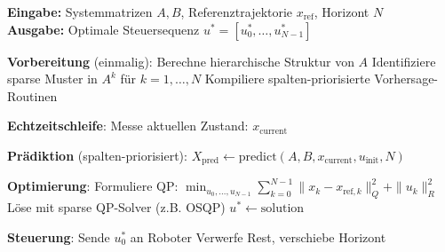 \documentclass[a4paper,12pt]{report}
\theoremstyle{definition}
\begin{document}
	\begin{algorithm}[H]
		\caption{Strukturausnutzende MPC für Robotersteuerung}
		\label{alg:robot-mpc}
		\textbf{Eingabe:} Systemmatrizen $A, B$, Referenztrajektorie $x_{\text{ref}}$, Horizont $N$ \\
		\textbf{Ausgabe:} Optimale Steuersequenz $u^* = [u_0^*, \ldots, u_{N-1}^*]$
		\begin{algorithmic}[1]
			\State \textbf{Vorbereitung} (einmalig):
			\State Berechne hierarchische Struktur von $A$
			\State Identifiziere sparse Muster in $A^k$ für $k = 1, \ldots, N$
			\State Kompiliere spalten-priorisierte Vorhersage-Routinen
			
			\State \textbf{Echtzeitschleife}:
			\State Messe aktuellen Zustand: $x_{\text{current}}$
			
			\State \textbf{Prädiktion} (spalten-priorisiert):
			\State $X_{\text{pred}} \gets \text{predict}(A, B, x_{\text{current}}, u_{\text{init}}, N)$
			
			\State \textbf{Optimierung}:
			\State Formuliere QP: $\min_{u_0, \ldots, u_{N-1}} \sum_{k=0}^{N-1} \|x_k - x_{\text{ref},k}\|^2_Q + \|u_k\|^2_R$
			\State Löse mit sparse QP-Solver (z.B. OSQP)
			\State $u^* \gets \text{solution}$
			
			\State \textbf{Steuerung}:
			\State Sende $u_0^*$ an Roboter
			\State Verwerfe Rest, verschiebe Horizont
			\EndWhile
		\end{algorithmic}
	\end{algorithm}
\end{document}
